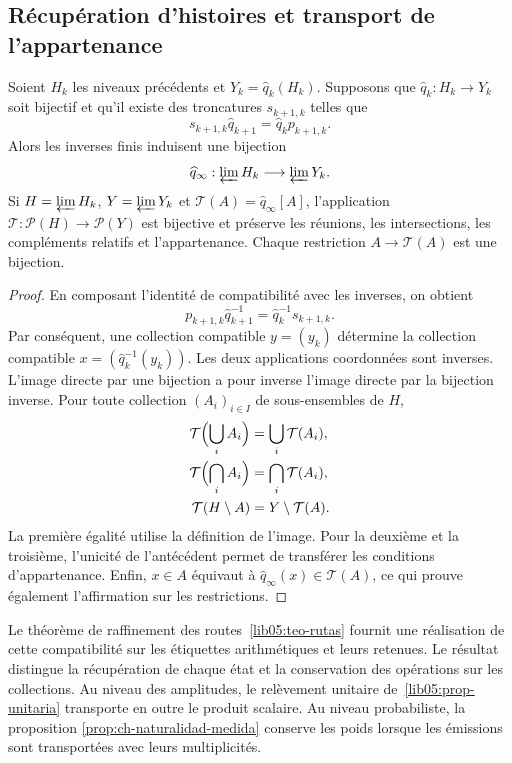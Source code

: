 \subsection{Récupération d'histoires et transport de l'appartenance}
\begin{proposition}
\label{lib07:prop-familias}
Soient \(H_k\) les niveaux précédents et \(Y_k=\widehat q_k(H_k)\).
Supposons que \(\widehat q_k:H_k\to Y_k\) soit bijectif et qu’il existe
des troncatures \(s_{k+1,k}\) telles que
\[
 s_{k+1,k}\widehat q_{k+1}=\widehat q_k p_{k+1,k}.
\]
Alors les inverses finis induisent une bijection
\[
 \widehat q_\infty:\varprojlim H_k\longrightarrow\varprojlim Y_k.
\]
Si \(H=\varprojlim H_k\), \(Y=\varprojlim Y_k\) et \(\mathcal T(A)=\widehat q_\infty[A]\), l'application \(\mathcal T:\mathcal P(H)\to\mathcal P(Y)\) est bijective et préserve les réunions, les intersections, les compléments relatifs et l'appartenance. Chaque restriction \(A\to\mathcal T(A)\) est une bijection.
\end{proposition}
\begin{proof}
En composant l’identité de compatibilité avec les inverses, on obtient
\[
 p_{k+1,k}\widehat q_{k+1}^{-1}
   =\widehat q_k^{-1}s_{k+1,k}.
\]
Par conséquent, une collection compatible \(y=(y_k)\) détermine la collection
compatible \(x=(\widehat q_k^{-1}(y_k))\). Les deux applications
coordonnées sont inverses. L’image directe par une bijection a
pour inverse l’image directe par la bijection inverse. Pour toute
collection \((A_i)_{i\in I}\) de sous-ensembles de \(H\),
\[
 \begin{aligned}
 \mathcal T\Bigl(\bigcup_i A_i\Bigr)&=\bigcup_i\mathcal T(A_i),\\
 \mathcal T\Bigl(\bigcap_i A_i\Bigr)&=\bigcap_i\mathcal T(A_i),\\
 \mathcal T(H\setminus A)&=Y\setminus\mathcal T(A).
 \end{aligned}
\]
La première égalité utilise la définition de l'image. Pour la deuxième et la troisième, l'unicité de l'antécédent permet de transférer les conditions d'appartenance. Enfin, \(x\in A\) équivaut à \(\widehat q_\infty(x)\in\mathcal T(A)\), ce qui prouve également l'affirmation sur les restrictions.
\end{proof}

Le théorème de raffinement des routes~\ref{lib05:teo-rutas}
fournit une réalisation de cette compatibilité sur les étiquettes
arithmétiques et leurs retenues. Le résultat distingue la récupération
de chaque état et la conservation des opérations sur les collections.
Au niveau des amplitudes, le relèvement unitaire
de~\ref{lib05:prop-unitaria} transporte en outre le produit scalaire.
Au niveau probabiliste, la proposition
\ref{prop:ch-naturalidad-medida} conserve les poids lorsque les
émissions sont transportées avec leurs multiplicités.

